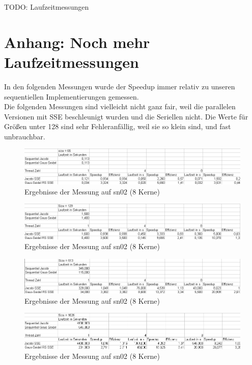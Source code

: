 \documentclass{article}
\begin{document}
TODO: Laufzeitmessungen

\section{Anhang: Noch mehr Laufzeitmessungen}
In den folgenden Messungen wurde der Speedup immer relativ zu unseren sequentiellen Implementierungen gemessen.
\\
Die folgenden Messungen sind vielleicht nicht ganz fair, weil die parallelen Versionen mit SSE beschleunigt wurden und die Seriellen nicht. Die Werte für Größen unter 128 sind sehr Fehleranfällig, weil sie so klein sind, und fast unbrauchbar. \label{ergebnisse}
\begin{figure}[h] 
  \centering
     \includegraphics[width=1.0\textwidth]{bilder/sn265.png}
  \caption{Ergebnisse der Messung auf sn02 (8 Kerne)}
\end{figure}
\begin{figure}[h] 
  \centering
     \includegraphics[width=1.0\textwidth]{bilder/sn2129.png}
  \caption{Ergebnisse der Messung auf sn02 (8 Kerne)}
\end{figure}
\begin{figure}[h] 
  \centering
     \includegraphics[width=1.0\textwidth]{bilder/sn2513.png}
  \caption{Ergebnisse der Messung auf sn02 (8 Kerne)}
\end{figure}
\begin{figure}[h] 
  \centering
     \includegraphics[width=1.0\textwidth]{bilder/sn21025.png}
  \caption{Ergebnisse der Messung auf sn02 (8 Kerne)}
\end{figure}
\end{document}
